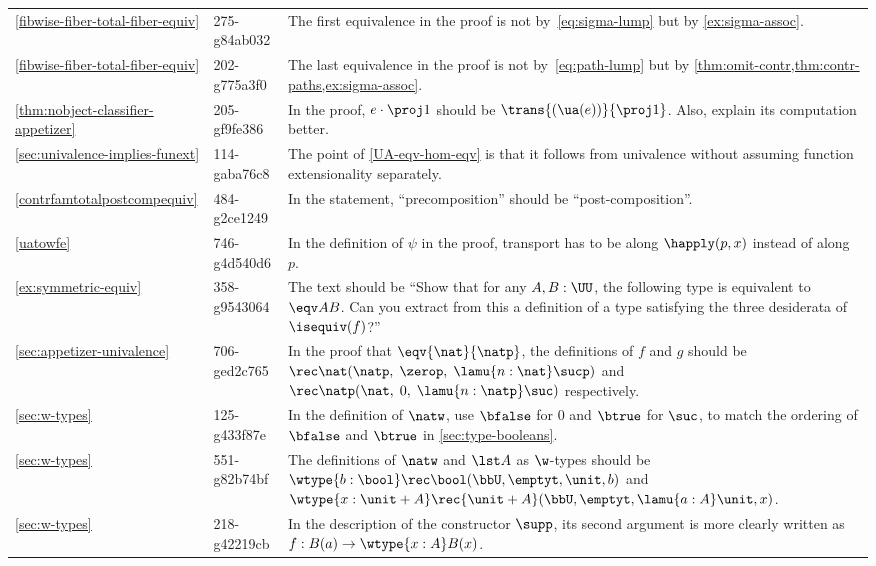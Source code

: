 \documentclass[
%
%
11pt %
]{article}
\begin{document}
\begin{longtable}{llp{10.5cm}}
  \cref{fibwise-fiber-total-fiber-equiv}
  & 275-g84ab032
  & The first equivalence in the proof is not by~\eqref{eq:sigma-lump} but by \cref{ex:sigma-assoc}.\\
  \cref{fibwise-fiber-total-fiber-equiv}
  & 202-g775a3f0
  & The last equivalence in the proof is not by~\eqref{eq:path-lump} but by \cref{thm:omit-contr,thm:contr-paths,ex:sigma-assoc}.\\
  \cref{thm:nobject-classifier-appetizer}
  & 205-gf9fe386
  & In the proof, $e\cdot \proj1$ should be $\trans{(\ua(e))}{\proj1}$.  Also, explain its computation better.\\
  \cref{sec:univalence-implies-funext}
  & 114-gaba76c8
  & The point of \cref{UA-eqv-hom-eqv} is that it follows from univalence without assuming function extensionality separately.\\
  \cref{contrfamtotalpostcompequiv}
  & 484-g2ce1249
  & In the statement, ``precomposition'' should be ``post-composition''.\\
  \cref{uatowfe}
  & 746-g4d540d6
  & In the definition of $\psi$ in the proof, transport has to be along $\happly(p,x)$ instead of along $p$.\\
  \cref{ex:symmetric-equiv}
  & 358-g9543064
  & The text should be ``Show that for any $A,B:\UU$, the following type is equivalent to $\eqv A B$.  Can you extract from this a definition of a type satisfying the three desiderata of $\isequiv(f)$?''\\
  \cref{sec:appetizer-univalence}
  & 706-ged2c765
  & In the proof that $\eqv{\nat}{\natp}$, the definitions of $f$ and $g$ should be $\rec\nat(\natp, \; \zerop, \;  \lamu{n:\nat} \sucp)$ and $\rec\natp(\nat, \; 0, \;  \lamu{n:\natp} \suc)$ respectively.\\
  \cref{sec:w-types}
  & 125-g433f87e
  & In the definition of $\natw$, use $\bfalse$ for $0$ and $\btrue$ for $\suc$, to match the ordering of $\bfalse$ and $\btrue$ in \cref{sec:type-booleans}.\\
  \cref{sec:w-types}
  & 551-g82b74bf
  & The definitions of $\natw$ and $\lst A$ as $\w$-types should be $\wtype{b:\bool} \rec\bool(\bbU,\emptyt,\unit,b)$ and $\wtype{x: \unit + A} \rec{\unit + A}(\bbU,  \emptyt,  \lamu{a:A} \unit, x)$.\\
  \cref{sec:w-types}
  & 218-g42219cb
  & In the description of the constructor $\supp$, its second argument is more clearly written as $f : B(a) \to \wtype{x:A} B(x)$.\\

\end{longtable}
\end{document}
